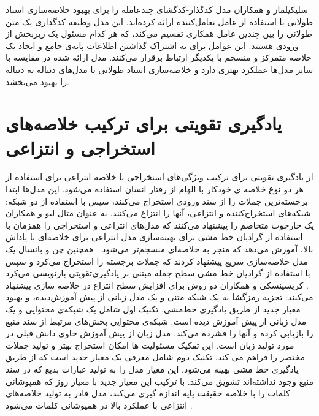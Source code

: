 سلیکیلماز
 و همکاران مدل کدگذار-کدگشای چندعامله را برای بهبود خلاصه‌سازی اسناد طولانی با استفاده از عامل تعامل‌کننده 
 ارائه کرده‌اند. این مدل وظیفه کدگذاری یک متن طولانی را بین چندین عامل همکاری تقسیم می‌کند، که هر کدام مسئول یک زیربخش از ورودی هستند. این عوامل برای به اشتراک گذاشتن اطلاعات پایه‌ی جامع و ایجاد یک خلاصه متمرکز و منسجم با یکدیگر ارتباط برقرار می‌کنند.  مدل ارائه شده در مقایسه با سایر مدل‌ها عملکرد بهتری دارد و خلاصه‌سازی اسناد طولانی با مدل‌های دنباله به دنباله را بهبود می‌بخشد.
\section{یادگیری تقویتی برای ترکیب خلاصه‌های استخراجی و انتزاعی} 
  از یادگیری تقویتی برای ترکیب ویژگی‌های استخراجی با خلاصه انتزاعی برای استفاده از هر دو نوع خلاصه ی خودکار با الهام از رفتار انسان استفاده می‌شود. این مدل‌ها ابتدا برجسته‌ترین جملات را از سند ورودی استخراج می‌کنند، سپس با استفاده از دو شبکه: شبکه‌های استخراج‌کننده و انتزاعی، آنها را انتزاع می‌کنند. به عنوان مثال لیو
   و همکاران یک چارچوب متخاصم را پیشنهاد می‌کنند که مدل‌های انتزاعی و استخراجی را همزمان با استفاده از گرادیان خط ‌مشی برای بهینه‌سازی مدل انتزاعی برای خلاصه‌ای با پاداش بالا، آموزش می‌دهد که منجر به خلاصه‌ای منسجم‌تر می‌شود
  \cite{liu2018generative}.
  همچنین چن و بانسال
   یک مدل خلاصه‌سازی سریع پیشنهاد کردند که جملات برجسته را استخراج می‌کرد و سپس با استفاده از گرادیان خط مشی سطح جمله مبتنی بر یادگیری‌تقویتی بازنویسی می‌کرد
  \cite{chen2018fast}.
کریسینسکی 
و همکاران  دو روش برای افزایش سطح انتزاع در خلاصه سازی  پیشنهاد می‌کنند: تجزیه رمزگشا به یک شبکه متنی و یک مدل زبانی از پیش آموزش‌دیده، و بهبود معیار جدید از طریق یادگیری خط‌مشی.
تکنیک اول شامل یک شبکه‌ی محتوایی
 و یک مدل زبانی از پیش آموزش دیده است. شبکه‌ی محتوایی  بخش‌های مرتبط از سند منبع را بازیابی کرده و آنها را فشرده می‌کند. مدل زبان از پیش آموزش حاوی دانش قبلی در مورد تولید زبان است. این تفکیک مسئولیت ها امکان استخراج بهتر و تولید جملات مختصر را فراهم می کند.
 تکنیک دوم شامل معرفی یک معیار جدید است که از طریق یادگیری خط مشی بهینه می‌شود. این معیار مدل را به تولید عبارات بدیع که در سند   منبع وجود نداشته‌اند تشویق می‌کند. با ترکیب این معیار جدید با معیار روژ که همپوشانی کلمات را با خلاصه حقیقت پایه اندازه گیری می‌کند، مدل قادر به تولید خلاصه‌های انتزاعی با عملکرد بالا در همپوشانی کلمات می‌شود
 \cite{kryscinski-etal-2018-improving}.

